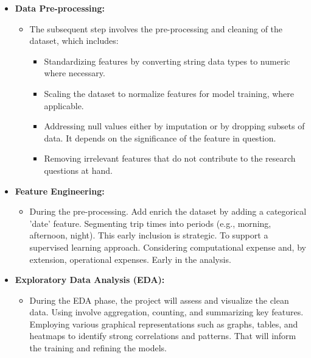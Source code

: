 \documentclass[12pt, a4paper]{article}
\begin{document}
\begin{itemize}
            \item \textbf{Data Pre-processing:}
            \begin{itemize}
                    \item The subsequent step involves the pre-processing and cleaning of the dataset, which includes:
                        \begin{itemize}
                            \item Standardizing features by converting string data types to numeric where necessary.
                            \item Scaling the dataset to normalize features for model training, where applicable.
                            \item Addressing null values either by imputation or by dropping subsets of data. It depends on the significance of the feature in question.
                            \item Removing irrelevant features that do not contribute to the research questions at hand.
                        \end{itemize}
            \end{itemize}
            \item \textbf{Feature Engineering:}
            \begin{itemize}
                    \item During the pre-processing. Add enrich the dataset by adding a categorical 'date' feature.
                    Segmenting trip times into periods (e.g., morning, afternoon, night). \newline This early inclusion is strategic.
                    To  support a supervised learning approach. Considering  computational expense and, by extension, operational expenses. Early in the analysis.
            \end{itemize}
            \item \textbf{Exploratory Data Analysis (EDA):}
                \begin{itemize}
                        \item During the EDA phase, the project will assess and visualize the clean data.
                        \newline Using involve aggregation, counting, and summarizing key features.
                        Employing various graphical representations such as graphs, tables, and heatmaps to identify strong correlations and patterns.
                        \newline That will inform the training and refining the models.
                \end{itemize}


\end{itemize}
\end{document}
